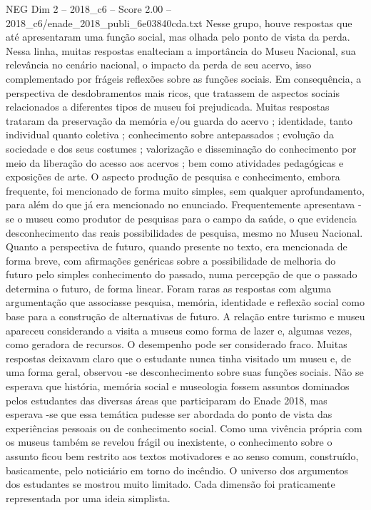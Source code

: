 \begin{textsample}{NEG Dim 2 – 2018\_c6 – Score 2.00 – 2018\_c6/enade\_2018\_publi\_6e03840cda.txt}
Nesse grupo, houve respostas que até apresentaram uma função social, mas olhada pelo ponto de vista da perda.
Nessa linha, muitas respostas enalteciam a importância do Museu Nacional, sua relevância no cenário nacional, o impacto da perda de seu acervo, isso complementado por frágeis reflexões sobre as funções sociais.
Em consequência, a perspectiva de desdobramentos mais ricos, que tratassem de aspectos sociais relacionados a diferentes tipos de museu foi prejudicada.
Muitas respostas trataram da preservação da memória e/ou guarda do acervo ; identidade, tanto individual quanto coletiva ; conhecimento sobre antepassados ; evolução da sociedade e dos seus costumes ; valorização e disseminação do conhecimento por meio da liberação do acesso aos acervos ; bem como atividades pedagógicas e exposições de arte.
O aspecto produção de pesquisa e conhecimento, embora frequente, foi mencionado de forma muito simples, sem qualquer aprofundamento, para além do que já era mencionado no enunciado.
Frequentemente apresentava -se o museu como produtor de pesquisas para o campo da saúde, o que evidencia desconhecimento das reais possibilidades de pesquisa, mesmo no Museu Nacional.
Quanto a perspectiva de futuro, quando presente no texto, era mencionada de forma breve, com afirmações genéricas sobre a possibilidade de melhoria do futuro pelo simples conhecimento do passado, numa percepção de que o passado determina o futuro, de forma linear.
Foram raras as respostas com alguma argumentação que associasse pesquisa, memória, identidade e reflexão social como base para a construção de alternativas de futuro.
A relação entre turismo e museu apareceu considerando a visita a museus como forma de lazer e, algumas vezes, como geradora de recursos.
O desempenho pode ser considerado fraco.
Muitas respostas deixavam claro que o estudante nunca tinha visitado um museu e, de uma forma geral, observou -se desconhecimento sobre suas funções sociais.
Não se esperava que história, memória social e museologia fossem assuntos dominados pelos estudantes das diversas áreas que participaram do Enade 2018, mas esperava -se que essa temática pudesse ser abordada do ponto de vista das experiências pessoais ou de conhecimento social.
Como uma vivência própria com os museus também se revelou frágil ou inexistente, o conhecimento sobre o assunto ficou bem restrito aos textos motivadores e ao senso comum, construído, basicamente, pelo noticiário em torno do incêndio.
O universo dos argumentos dos estudantes se mostrou muito limitado.
Cada dimensão foi praticamente representada por uma ideia simplista.

\end{textsample}
